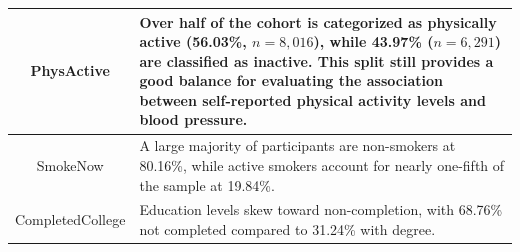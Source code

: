 \documentclass{article}
\begin{document}
\begin{center}
\begin{tabular}{|c|>{\centering\arraybackslash}p{12cm}|}
        PhysActive & Over half of the cohort is categorized as physically active (56.03\%, $n = 8,016$), while 43.97\% ($n = 6,291$) are classified as inactive. This split still provides a good balance for evaluating the association between self-reported physical activity levels and blood pressure. \\
        \hline
        SmokeNow & A large majority of participants are non-smokers at 80.16\%, while active smokers account for nearly one-fifth of the sample at 19.84\%. \\
        \hline
        CompletedCollege & Education levels skew toward non-completion, with 68.76\% not completed compared to 31.24\% with degree. \\
        \hline
    \end{tabular}
\end{center}
\end{document}

